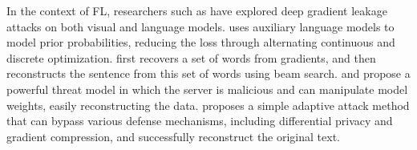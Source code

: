 In the context of FL, researchers such as \citet{zhu2019deep} have explored deep gradient leakage attacks on both visual and language models. 
\citet{balunovic2022lamp} uses auxiliary language models to model prior probabilities, reducing the loss through alternating continuous and discrete optimization. \citet{gupta2022recovering} first recovers a set of words from gradients, and then reconstructs the sentence from this set of words using beam search. \citet{fowl2022decepticons} and \citet{boenisch2023curious} propose a powerful threat model in which the server is malicious and can manipulate model weights, easily reconstructing the data.
\citet{wu2023learning} proposes a simple adaptive attack method that can bypass various defense mechanisms, including differential privacy and gradient compression, and successfully reconstruct the original text.


